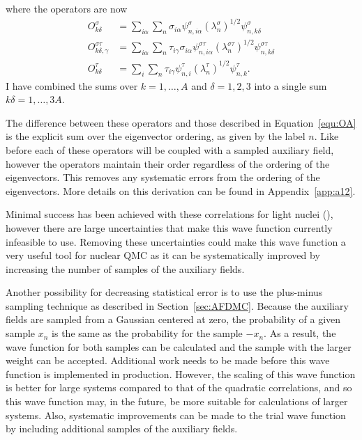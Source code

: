 where the operators are now
\begin{equation}
\begin{split}
   O_{k\delta}^{\sigma} &= \sum\limits_{i\alpha}\sum\limits_n \sigma_{i\alpha}\psi_{n,i\alpha}^\sigma\left(\lambda_n^\sigma\right)^{1/2}\psi_{n,k\delta}^{\sigma} \\
   O_{k\delta,\gamma}^{\sigma\tau} &= \sum\limits_{i\alpha}\sum\limits_n \tau_{i\gamma}\sigma_{i\alpha}\psi_{n,i\alpha}^{\sigma\tau}\left(\lambda_n^{\sigma\tau}\right)^{1/2}\psi_{n,k\delta}^{\sigma\tau} \\
   O_{k\delta}^{\tau} &= \sum\limits_{i}\sum\limits_n \tau_{i\gamma}\psi_{n,i}^\tau\left(\lambda_n^\tau\right)^{1/2}\psi_{n,k}^{\tau}.
\end{split}
\end{equation}
I have combined the sums over $k=1,\ldots,A$ and $\delta=1,2,3$ into a single sum $k\delta=1,\ldots,3A$.

The difference between these operators and those described in Equation~\ref{equ:OA} is the explicit sum over the eigenvector ordering, as given by the label $n$. Like before each of these operators will be coupled with a sampled auxiliary field, however the operators maintain their order regardless of the ordering of the eigenvectors. This removes any systematic errors from the ordering of the eigenvectors. More details on this derivation can be found in Appendix~\ref{app:a12}.

Minimal success has been achieved with these correlations for light nuclei (\cite{bouadani2009_dissertation}), however there are large uncertainties that make this wave function currently infeasible to use. Removing these uncertainties could make this wave function a very useful tool for nuclear QMC as it can be systematically improved by increasing the number of samples of the auxiliary fields.

Another possibility for decreasing statistical error is to use the plus-minus sampling technique as described in Section~\ref{sec:AFDMC}. Because the auxiliary fields are sampled from a Gaussian centered at zero, the probability of a given sample $x_n$ is the same as the probability for the sample $-x_n$. As a result, the wave function for both samples can be calculated and the sample with the larger weight can be accepted. Additional work needs to be made before this wave function is implemented in production. However, the scaling of this wave function is better for large systems compared to that of the quadratic correlations, and so this wave function may, in the future, be more suitable for calculations of larger systems. Also, systematic improvements can be made to the trial wave function by including additional samples of the auxiliary fields.

